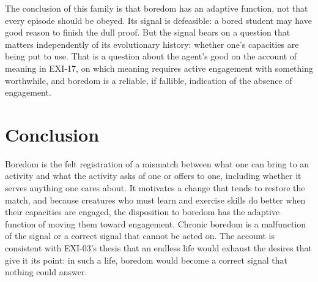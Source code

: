 \documentclass{situationist-preprint}
\begin{document}
\begin{reply}
The conclusion of this family is that boredom has an adaptive function, not that every episode should be obeyed. Its signal is defeasible: a bored student may have good reason to finish the dull proof. But the signal bears on a question that matters independently of its evolutionary history: whether one's capacities are being put to use. That is a question about the agent's good on the account of meaning in EXI-17, on which meaning requires active engagement with something worthwhile, and boredom is a reliable, if fallible, indication of the absence of engagement.
\end{reply}

\section{Conclusion}

Boredom is the felt registration of a mismatch between what one can bring to an activity and what the activity asks of one or offers to one, including whether it serves anything one cares about. It motivates a change that tends to restore the match, and because creatures who must learn and exercise skills do better when their capacities are engaged, the disposition to boredom has the adaptive function of moving them toward engagement. Chronic boredom is a malfunction of the signal or a correct signal that cannot be acted on. The account is consistent with EXI-03's thesis that an endless life would exhaust the desires that give it its point: in such a life, boredom would become a correct signal that nothing could answer.
\end{document}
